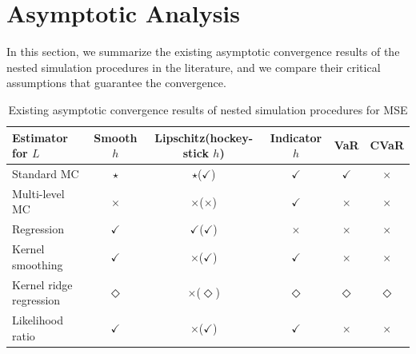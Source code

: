 \section{Asymptotic Analysis} \label{sec1:asymptotic-convergence}
In this section, we summarize the existing asymptotic convergence results of the nested simulation procedures in the literature, and we compare their critical assumptions that guarantee the convergence.

\begin{table}[ht]
    \centering
    \footnotesize
    \begin{tabular}{|l|c|c|c|c|c|}
    \hline
    \textbf{Estimator for} $L$ & \textbf{Smooth} $h$ & \textbf{Lipschitz}(\textbf{hockey-stick} $h$) & \textbf{Indicator} $h$ & \textbf{VaR} & \textbf{CVaR} \\
    \hline
    Standard MC & $\star$ & $\star$($\checkmark$) & $\checkmark$ & $\checkmark$ & $\times$ \\
    \hline
    Multi-level MC & $\times$ & $\times$($\times$) & $\checkmark$ & $\times$ & $\times$ \\
    \hline
    Regression & $\checkmark$ & $\checkmark$($\checkmark$) & $\times$ & $\times$ & $\times$ \\
    \hline
    Kernel smoothing & $\checkmark$ & $\times$($\checkmark$) & $\checkmark$ & $\times$ & $\times$ \\
    \hline
    Kernel ridge regression & $\Diamond$ & $\times$($\Diamond$) & $\Diamond$ & $\Diamond$ & $\Diamond$ \\
    \hline
    Likelihood ratio & $\checkmark$ & $\times$($\checkmark$) & $\checkmark$ & $\times$ & $\times$ \\
    \hline
    \end{tabular}
    \caption{Existing asymptotic convergence results of nested simulation procedures for MSE}
    \label{tab1:asymConv-mse}
\end{table}


